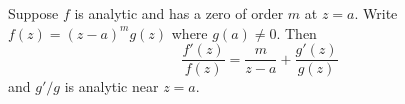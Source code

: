 Suppose $f$ is analytic and has a zero of order $m$ at $z = a$. Write $f(z) = (z-a)^m g(z)$ where $g(a) \neq 0$. Then
$$\frac{f'(z)}{f(z)} = \frac{m}{z-a} + \frac{g'(z)}{g(z)}$$
and $g'/g$ is analytic near $z = a$.
